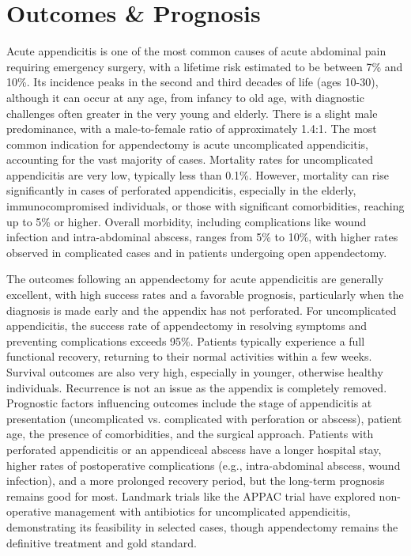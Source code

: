 \section*{Outcomes \& Prognosis}
Acute appendicitis is one of the most common causes of acute abdominal pain requiring emergency surgery, with a lifetime risk estimated to be between 7\% and 10\%. Its incidence peaks in the second and third decades of life (ages 10-30), although it can occur at any age, from infancy to old age, with diagnostic challenges often greater in the very young and elderly. There is a slight male predominance, with a male-to-female ratio of approximately 1.4:1. The most common indication for appendectomy is acute uncomplicated appendicitis, accounting for the vast majority of cases. Mortality rates for uncomplicated appendicitis are very low, typically less than 0.1\%. However, mortality can rise significantly in cases of perforated appendicitis, especially in the elderly, immunocompromised individuals, or those with significant comorbidities, reaching up to 5\% or higher. Overall morbidity, including complications like wound infection and intra-abdominal abscess, ranges from 5\% to 10\%, with higher rates observed in complicated cases and in patients undergoing open appendectomy.

The outcomes following an appendectomy for acute appendicitis are generally excellent, with high success rates and a favorable prognosis, particularly when the diagnosis is made early and the appendix has not perforated. For uncomplicated appendicitis, the success rate of appendectomy in resolving symptoms and preventing complications exceeds 95\%. Patients typically experience a full functional recovery, returning to their normal activities within a few weeks. Survival outcomes are also very high, especially in younger, otherwise healthy individuals. Recurrence is not an issue as the appendix is completely removed. Prognostic factors influencing outcomes include the stage of appendicitis at presentation (uncomplicated vs. complicated with perforation or abscess), patient age, the presence of comorbidities, and the surgical approach. Patients with perforated appendicitis or an appendiceal abscess have a longer hospital stay, higher rates of postoperative complications (e.g., intra-abdominal abscess, wound infection), and a more prolonged recovery period, but the long-term prognosis remains good for most. Landmark trials like the APPAC trial have explored non-operative management with antibiotics for uncomplicated appendicitis, demonstrating its feasibility in selected cases, though appendectomy remains the definitive treatment and gold standard.

